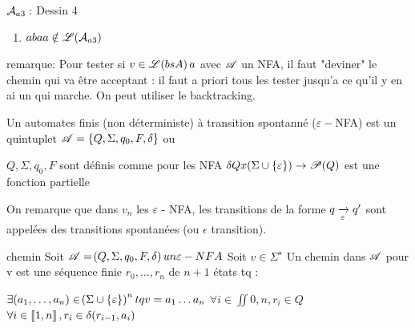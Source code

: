     \begin{example}{}{}
        $\mathcal{A}_{a3} :$
        \newline
        Dessin 4
        \newline 
        
        \begin{enumerate}
            \item 
            
            
            \itt $abaa \notin \mathscr{L}(\mathcal{A}_{a3})$
        \end{enumerate}
    \end{example}
    
    
    remarque: Pour tester si $v\in \mathscr{L}\!\left(bsA\right) a$ avec $\mathscr{A}$ un NFA, il faut "deviner" le chemin qui va être acceptant : il faut a priori tous les tester jusqu'a ce qu'il y en ai un qui marche. On peut utiliser le backtracking.
    
    \begin{definition}{}{}
        Un automates finis (non déterministe) 
        à transition spontanné ($\varepsilon -$NFA) %
        est un quintuplet $\mathscr{A} = \left\{Q, \Sigma, q_0, F, \delta\right\}$ ou 
        
        \begin{enumerate}
            \itt $Q, \Sigma, q_0, F$ sont définis comme pour les NFA
            \itt $\delta Q x \!\left(\Sigma \cup \left\{\varepsilon\right\}\right) \to \mathscr{P} \!\left(Q\right)$ est une fonction partielle
        \end{enumerate}
        
    \end{definition}
    
    On remarque que dans $v_n$ les $\varepsilon$ - NFA,  les transitions de la forme $q \lima{\epsilon} q'$ sont appelées des transitions spontanées (ou $\epsilon$ transition).
    
    
    \begin{definition}{chemin}{}
        Soit $\mathscr{A} = \!\left(Q, \Sigma, q_0, F, \delta\right) un \varepsilon-NFA$ Soit $v \in \Sigma^\star$ Un chemin dans $\mathscr{A}$ pour v est une séquence finie $r_0, \dots , r_n$ de $n+1$ états tq :
        
        \begin{enumerate}
            \itt $\exists (a_1, \dots, a_n) \in \!\left(\Sigma \cup \left\{\varepsilon\right\}\right)^n tq v = a_1 \dots a_n$
            \itt $\forall i \in \iint{0, n}, r_i \in Q$
            \itt $\forall i \in \left\llbracket1, n\right\rrbracket, r_i \in \delta \!\left(r_{i-1}, a_i\right)$
        \end{enumerate}
            
    \end{definition}
    
